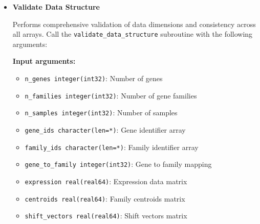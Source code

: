 \documentclass[11pt]{article}
\begin{document}
\begin{enumerate}
\begin{itemize}
\begin{lstlisting}[language=Fortran, caption={Filter Unassigned Genes}]
! First create the mask
call get_unassigned_mask(gene_to_fam, unassigned_mask, n_kept)

! Then apply it to filter all arrays
call apply_unassigned_mask(gene_ids, expr_data, gene_to_fam, &
                          unassigned_mask, n_kept, ierr)
! Arrays are now reallocated to size n_kept
	      	      \end{lstlisting}
	      	      
	      	\item \textbf{Validate Data Structure}
	      	      
	      	      Performs comprehensive validation of data dimensions and consistency across
	      	      all arrays. Call the \texttt{validate\_data\_structure} subroutine with
	      	      the following arguments:
	      	      
	      	      \textbf{Input arguments:}
	      	      \begin{itemize}
	      	      	\item \texttt{n\_genes integer(int32)}: Number of genes
	      	      	      
	      	      	\item \texttt{n\_families integer(int32)}: Number of gene families
	      	      	      
	      	      	\item \texttt{n\_samples integer(int32)}: Number of samples
	      	      	      
	      	      	\item \texttt{gene\_ids character(len=*)}: Gene identifier array
	      	      	      
	      	      	\item \texttt{family\_ids character(len=*)}: Family identifier array
	      	      	      
	      	      	\item \texttt{gene\_to\_family integer(int32)}: Gene to family mapping
	      	      	      
	      	      	\item \texttt{expression real(real64)}: Expression data matrix
	      	      	      
	      	      	\item \texttt{centroids real(real64)}: Family centroids matrix
	      	      	      
	      	      	\item \texttt{shift\_vectors real(real64)}: Shift vectors matrix
	      	      	      

\end{itemize}
\end{itemize}
\end{enumerate}
\end{document}
